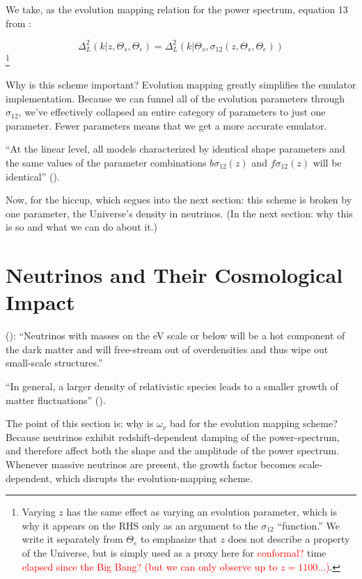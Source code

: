 We take, as the evolution mapping relation for the power spectrum, equation 13
from :

\begin{equation}
\label{eq: evMapping_pSpectrum}
    \Delta^2_L (k | z, \Theta_s, \Theta_e)
    =
    \Delta_L^2 (k | \Theta_s, \sigma_{12} \left( z, \Theta_s, \Theta_e \right))
\end{equation}\footnote{Varying $z$ has the same effect as varying an
evolution parameter, which is why it appears on the RHS only as an argument to
the $\sigma_{12}$ ``function.'' We write it separately from $\Theta_e$ to
emphasize that $z$ does not describe a property of the Universe, but is
simply used as a proxy here for \textcolor{red}{conformal?} time
\textcolor{red}{elapsed since the Big Bang? (but we can only observe up to
$z = 1100$...)}.}

Why is this scheme important? Evolution mapping greatly simplifies the emulator
implementation. Because we can
funnel all of the evolution parameters through $\sigma_{12}$, we've effectively
collapsed an entire category of parameters to just one parameter. Fewer
parameters means that we get a more accurate emulator.

``At the linear level, all models characterized by identical shape parameters
and the same values of the parameter combinations $b \sigma_{12}(z)$ and
$f \sigma_{12}(z)$ will be identical'' ().

Now, for the hiccup, which segues into the next section: this scheme is broken by one parameter, the Universe's
density in neutrinos. (In the next section: why this is so and what we can do
about it.)


\section{Neutrinos and Their Cosmological Impact}

(): ``Neutrinos with masses on the eV scale or below will be a
hot component of the dark matter and will free-stream out of overdensities and
thus wipe out small-scale structures.''

``In general, a larger density of relativistic species leads to a smaller
growth of matter fluctuations'' ().

The point of this section is: why is $\omega_\nu$ bad for the
evolution mapping scheme? Because neutrinos exhibit redshift-dependent
damping of the power-spectrum, and therefore affect both the shape and the
amplitude of the power spectrum. Whenever massive neutrinos are present,
the growth factor becomes scale-dependent, which disrupts the
evolution-mapping scheme.

